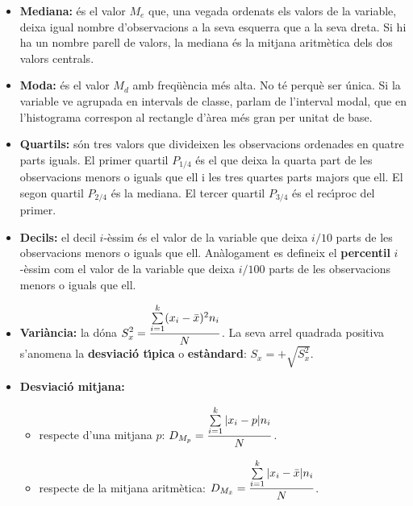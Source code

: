 \begin{itemize}

\item {\bf Mediana:} 
\'es el valor $M_e$ que, una vegada ordenats els valors de
la variable, deixa igual nombre d'observacions a la seva esquerra que a la seva
dreta. Si hi ha un nombre parell de valors, la mediana \'es la mitjana aritm\`etica
dels dos valors centrals.

\item {\bf Moda:} \'es el valor $M_d$ amb freq\"u\`encia m\'es alta. No t\'e perqu\`e
ser \'unica. Si la variable ve agrupada en intervals de classe, parlam de
l'interval modal, que en l'histograma correspon al rectangle d'\`area m\'es gran
per unitat de base.

\item {\bf Quartils:} s\'on tres valors que divideixen les observacions ordenades
en quatre parts iguals. El primer quartil $P_{1/4}$ \'es el que deixa la quarta
part de les observacions menors o iguals que ell i les tres quartes parts
majors que ell. El segon quartil $P_{2/4}$ \'es la mediana. El tercer quartil
$P_{3/4}$ \'es el rec\'{\i}proc del primer.

\item {\bf Decils:} el decil $i$-\`essim \'es el valor de la variable que deixa
$i/10$ parts de les observacions menors o iguals que ell. An\`alogament es 
defineix el {\bf percentil} $i$-\`essim com el valor de la variable que deixa
$i/100$ parts de les observacions menors o iguals que ell.

\item {\bf Vari\`ancia:} 
la d\'ona $\displaystyle S_x^2 =
{\sum\limits_{i=1}^k (x_i - \bar{x})^2 n_i \over N}$. La seva arrel quadrada
positiva s'anomena la {\bf desviaci\'o t\'{\i}pica} o {\bf est\`andard}: $\displaystyle
S_x = + \sqrt{S_x^2}$.

\item {\bf Desviaci\'o mitjana:}

\begin{itemize}

\item respecte d'una mitjana $p$: $\displaystyle D_{M_p} = {\sum\limits_{i=1}^k
| x_i - p | n_i \over N}$.

\item respecte de la mitjana aritm\`etica: $\displaystyle D_{M_{\bar{x}}} =
{\sum\limits_{i=1}^k | x_i - \bar{x} | n_i \over N}$.


\end{itemize}
\end{itemize}
